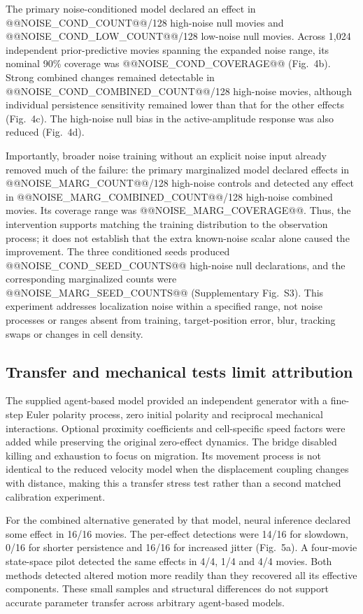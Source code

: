 \documentclass[12pt]{article}
\begin{document}
The primary noise-conditioned model declared an effect in @@NOISE_COND_COUNT@@/128 high-noise null movies and @@NOISE_COND_LOW_COUNT@@/128 low-noise null movies. Across 1,024 independent prior-predictive movies spanning the expanded noise range, its nominal 90\% coverage was @@NOISE_COND_COVERAGE@@ (Fig.~4b). Strong combined changes remained detectable in @@NOISE_COND_COMBINED_COUNT@@/128 high-noise movies, although individual persistence sensitivity remained lower than that for the other effects (Fig.~4c). The high-noise null bias in the active-amplitude response was also reduced (Fig.~4d).

Importantly, broader noise training without an explicit noise input already removed much of the failure: the primary marginalized model declared effects in @@NOISE_MARG_COUNT@@/128 high-noise controls and detected any effect in @@NOISE_MARG_COMBINED_COUNT@@/128 high-noise combined movies. Its coverage range was @@NOISE_MARG_COVERAGE@@. Thus, the intervention supports matching the training distribution to the observation process; it does not establish that the extra known-noise scalar alone caused the improvement. The three conditioned seeds produced @@NOISE_COND_SEED_COUNTS@@ high-noise null declarations, and the corresponding marginalized counts were @@NOISE_MARG_SEED_COUNTS@@ (Supplementary Fig.~S3). This experiment addresses localization noise within a specified range, not noise processes or ranges absent from training, target-position error, blur, tracking swaps or changes in cell density.

\subsection*{Transfer and mechanical tests limit attribution}
The supplied agent-based model provided an independent generator with a fine-step Euler polarity process, zero initial polarity and reciprocal mechanical interactions. Optional proximity coefficients and cell-specific speed factors were added while preserving the original zero-effect dynamics. The bridge disabled killing and exhaustion to focus on migration. Its movement process is not identical to the reduced velocity model when the displacement coupling changes with distance, making this a transfer stress test rather than a second matched calibration experiment.

For the combined alternative generated by that model, neural inference declared some effect in 16/16 movies. The per-effect detections were 14/16 for slowdown, 0/16 for shorter persistence and 16/16 for increased jitter (Fig.~5a). A four-movie state-space pilot detected the same effects in 4/4, 1/4 and 4/4 movies. Both methods detected altered motion more readily than they recovered all its effective components. These small samples and structural differences do not support accurate parameter transfer across arbitrary agent-based models.
\end{document}

